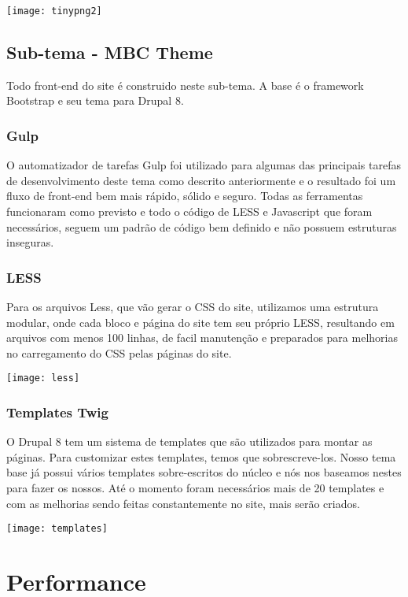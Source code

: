 \documentclass[
	12pt,				%
    oneside,			%
	a4paper,			%
	english,			%
	french,				%
	spanish,			%
	brazil				%
	]{abntex2}
\begin{document}
\texttt{[image: tinypng2]}

\subsection{Sub-tema - MBC Theme}
Todo front-end do site é construido neste sub-tema. A base é o framework Bootstrap e seu tema para Drupal 8. 

\subsubsection{Gulp}
O automatizador de tarefas Gulp foi utilizado para algumas das principais tarefas de desenvolvimento deste tema como descrito anteriormente e o resultado foi um fluxo de front-end bem mais rápido, sólido e seguro. Todas as ferramentas funcionaram como previsto e todo o código de LESS e Javascript que foram necessários, seguem um padrão de código bem definido e não possuem estruturas inseguras.

\subsubsection{LESS}
Para os arquivos Less, que vão gerar o CSS do site, utilizamos uma estrutura modular, onde cada bloco e página do site tem seu próprio LESS, resultando em arquivos com menos 100 linhas, de facil manutenção e preparados para melhorias no carregamento do CSS pelas páginas do site.

\texttt{[image: less]}

\subsubsection{Templates Twig}
O Drupal 8 tem um sistema de templates que são utilizados para montar as páginas. Para customizar estes templates, temos que sobrescreve-los. Nosso tema base já possui vários templates sobre-escritos do núcleo e nós nos baseamos nestes para fazer os nossos. Até o momento foram necessários mais de 20 templates e com as melhorias sendo feitas constantemente no site, mais serão criados.

\texttt{[image: templates]}

\section{Performance}
\end{document}
